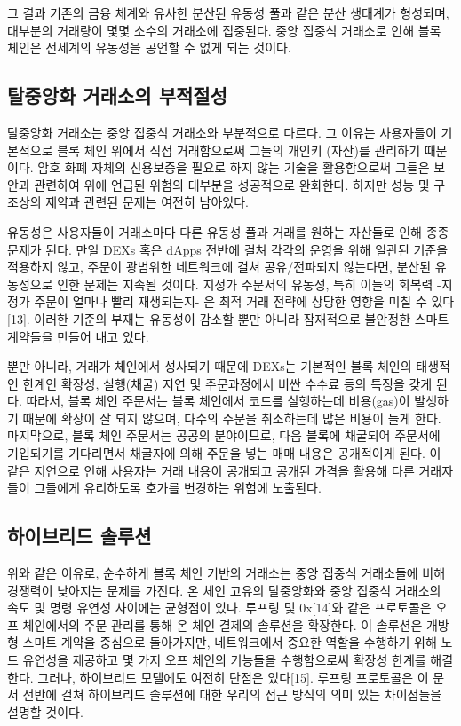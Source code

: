 \documentclass{article}
\begin{document}
\begin{multicols}{2}
그 결과 기존의 금융 체계와 유사한 분산된 유동성 풀과 같은 분산 생태계가 형성되며, 대부분의 거래량이 몇몇 소수의 거래소에 집중된다. 중앙 집중식 거래소로 인해 블록 체인은 전세계의 유동성을 공언할 수 없게 되는 것이다.

\subsection{탈중앙화 거래소의 부적절성}
탈중앙화 거래소는 중앙 집중식 거래소와 부분적으로 다르다. 그 이유는 사용자들이 기본적으로 블록 체인 위에서 직접 거래함으로써 그들의 개인키 (자산)를 관리하기 때문이다. 암호 화폐 자체의 신용보증을 필요로 하지 않는 기술을 활용함으로써 그들은 보안과 관련하여 위에 언급된 위험의 대부분을 성공적으로 완화한다. 하지만 성능 및 구조상의 제약과 관련된 문제는 여전히 남아있다. 

유동성은 사용자들이 거래소마다 다른 유동성 풀과 거래를 원하는 자산들로 인해 종종 문제가 된다. 만일 DEXs 혹은 dApps 전반에 걸쳐 각각의 운영을 위해 일관된 기준을 적용하지 않고, 주문이 광범위한 네트워크에 걸쳐 공유/전파되지 않는다면, 분산된 유동성으로 인한 문제는 지속될 것이다. 지정가 주문서의 유동성, 특히 이들의 회복력 -지정가 주문이 얼마나 빨리 재생되는지- 은 최적 거래 전략에 상당한 영향을 미칠 수 있다[13]. 이러한 기준의 부재는 유동성이 감소할 뿐만 아니라 잠재적으로 불안정한 스마트 계약들을 만들어 내고 있다.

뿐만 아니라, 거래가 체인에서 성사되기 때문에 DEXs는 기본적인 블록 체인의 태생적인 한계인 확장성, 실행(채굴) 지연 및 주문과정에서 비싼 수수료 등의 특징을 갖게 된다. 따라서, 블록 체인 주문서는 블록 체인에서 코드를 실행하는데 비용(gas)이 발생하기 때문에 확장이 잘 되지 않으며, 다수의 주문을 취소하는데 많은 비용이 들게 한다. 마지막으로, 블록 체인 주문서는 공공의 분야이므로, 다음 블록에 채굴되어 주문서에 기입되기를 기다리면서 채굴자에 의해 주문을 넣는 매매 내용은 공개적이게 된다. 이 같은 지연으로 인해 사용자는 거래 내용이 공개되고 공개된 가격을 활용해 다른 거래자들이 그들에게 유리하도록 호가를 변경하는 위험에 노출된다.

\subsection{하이브리드 솔루션} 
위와 같은 이유로, 순수하게 블록 체인 기반의 거래소는 중앙 집중식 거래소들에 비해 경쟁력이 낮아지는 문제를 가진다. 온 체인 고유의 탈중앙화와 중앙 집중식 거래소의 속도 및 명령 유연성 사이에는 균형점이 있다. 루프링 및 0x[14]와 같은 프로토콜은 오프 체인에서의 주문 관리를 통해 온 체인 결제의 솔루션을 확장한다. 이 솔루션은 개방형 스마트 계약을 중심으로 돌아가지만, 네트워크에서 중요한 역할을 수행하기 위해 노드 유연성을 제공하고 몇 가지 오프 체인의 기능들을 수행함으로써 확장성 한계를 해결한다. 그러나, 하이브리드 모델에도 여전히 단점은 있다[15]. 루프링 프로토콜은 이 문서 전반에 걸쳐 하이브리드 솔루션에 대한 우리의 접근 방식의 의미 있는 차이점들을 설명할 것이다.




\end{multicols}
\end{document}
